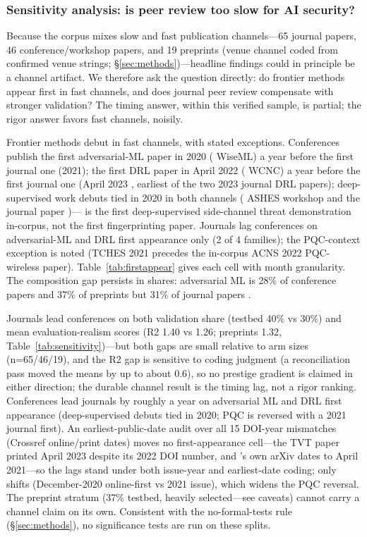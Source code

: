 \subsubsection{Sensitivity analysis: is peer review too slow for AI security?}
\label{sec:sensitivity}
Because the corpus mixes slow and fast publication channels---65 journal papers, 46 conference/workshop papers, and 19 preprints (venue channel coded from confirmed venue strings; \S\ref{sec:methods})---headline findings could in principle be a channel artifact. We therefore ask the question directly: do frontier methods appear first in fast channels, and does journal peer review compensate with stronger validation? The timing answer, within this verified sample, is partial; the rigor answer favors fast channels, noisily.

Frontier methods debut in fast channels, with stated exceptions. Conferences publish the first adversarial-ML paper in 2020 ( WiseML) a year before the first journal one (2021); the first DRL paper in April 2022 ( WCNC) a year before the first journal one (April 2023 , earliest of the two 2023 journal DRL papers); deep-supervised work debuts tied in 2020 in both channels ( ASHES workshop and the journal paper )--- is the first deep-supervised side-channel threat demonstration in-corpus, not the first fingerprinting paper. Journals lag conferences on adversarial-ML and DRL first appearance only (2 of 4 families); the PQC-context exception is noted (TCHES 2021  precedes the in-corpus ACNS 2022 PQC-wireless paper). Table~\ref{tab:firstappear} gives each cell with month granularity. The composition gap persists in shares: adversarial ML is 28\% of conference papers and 37\% of preprints but 31\% of journal papers .

Journals lead conferences on both validation share (testbed 40\% vs 30\%) and mean evaluation-realism scores (R2 1.40 vs 1.26; preprints 1.32, Table~\ref{tab:sensitivity})---but both gaps are small relative to arm sizes (n=65/46/19), and the R2 gap is sensitive to coding judgment (a reconciliation pass moved the means by up to about 0.6), so no prestige gradient is claimed in either direction; the durable channel result is the timing lag, not a rigor ranking. Conferences lead journals by roughly a year on adversarial ML and DRL first appearance (deep-supervised debuts tied in 2020; PQC is reversed with a 2021 journal first). An earliest-public-date audit over all 15 DOI-year mismatches (Crossref online/print dates) moves no first-appearance cell---the  TVT paper printed April 2023 despite its 2022 DOI number, and 's own arXiv dates to April 2021---so the lags stand under both issue-year and earliest-date coding; only  shifts (December-2020 online-first vs 2021 issue), which widens the PQC reversal. The preprint stratum (37\% testbed, heavily selected---see caveats) cannot carry a channel claim on its own. Consistent with the no-formal-tests rule (\S\ref{sec:methods}), no significance tests are run on these splits.

